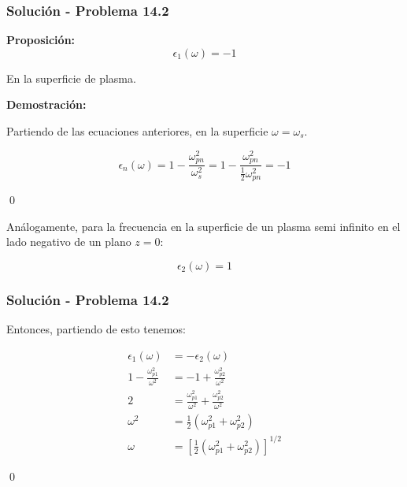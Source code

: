 \documentclass[10pt]{beamer}
\begin{document}
\begin{frame}
    \frametitle{Solución - Problema 14.2}

    \textbf{Proposición:}
    \begin{equation*}
        \epsilon_1(\omega) = -1
    \end{equation*}

    En la superficie de plasma.

    \textbf{Demostración:}

    Partiendo de las ecuaciones anteriores, en la superficie $\omega = \omega_s$.

    \begin{equation*}
        \epsilon_n(\omega) = 1-\frac{\omega_{pn}^2}{\omega_s^2} = 1-\frac{\omega_{pn}^2}{\frac{1}{2}\omega_{pn}^2} = -1
    \end{equation*}

    \qed

    Análogamente, para la frecuencia en la superficie de un plasma semi infinito en el lado negativo de un plano $z=0$:

    \begin{equation*}
        \epsilon_2(\omega) = 1
    \end{equation*}

\end{frame}

\begin{frame}
    \frametitle{Solución - Problema 14.2}

    Entonces, partiendo de esto tenemos:

    \begin{align*}
        \epsilon_1(\omega) &= -\epsilon_2(\omega)\\
        1-\frac{\omega_{p1}^2}{\omega^2} &= -1+\frac{\omega_{p2}^2}{\omega^2}\\
        2 &= \frac{\omega_{p1}^2}{\omega^2} +\frac{\omega_{p2}^2}{\omega^2}\\
        \omega^2 &= \frac{1}{2}\left(\omega_{p1}^2+\omega_{p2}^2\right)\\
        \omega &= \left[\frac{1}{2}\left(\omega_{p1}^2+\omega_{p2}^2\right)\right]^{1/2}
    \end{align*}

    \qed

\end{frame}
\end{document}
